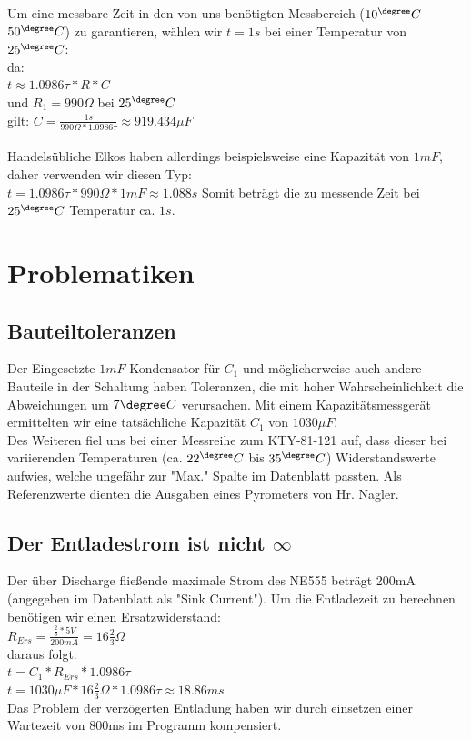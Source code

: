 \documentclass[12pt,titlepage]{article}
\begin{document}
		Um eine messbare Zeit in den von uns benötigten Messbereich ($10^{\degree}C$--$50^{\degree}C$) zu garantieren, wählen wir $t=1s$ bei einer Temperatur von $25^{\degree}C$:\\
		da:\\
		$t \approx 1.0986{\tau}*R*C$ \\
		und $R_1=990\Omega$ bei $25^{\degree}C$ \\
		gilt:
		$C = \frac{1s}{{990\Omega} * 1.0986{\tau}}  \approx 919.434{\mu}F$\\
		\hfill\\
		Handelsübliche Elkos haben allerdings beispielsweise eine Kapazität von $1mF$, daher verwenden wir diesen Typ:\\
		$t = 1.0986{\tau} * 990\Omega * 1mF \approx 1.088s$
		Somit beträgt die zu messende Zeit bei $25^{\degree}C$ Temperatur ca. $1s$.
	
		\section{Problematiken}	
			\subsection{Bauteiltoleranzen}
				Der Eingesetzte $1mF$ Kondensator für $C_1$ und möglicherweise auch andere Bauteile in der Schaltung haben Toleranzen, die mit hoher Wahrscheinlichkeit die Abweichungen um $7{\degree}C$ verursachen.
				Mit einem Kapazitätsmessgerät ermittelten wir eine tatsächliche Kapazität $C_1$ von $1030{\mu}F$.\\
				Des Weiteren fiel uns bei einer Messreihe zum KTY-81-121 auf, dass dieser bei variierenden Temperaturen (ca. $22^{\degree}C$ bis $35^{\degree}C$) Widerstandswerte aufwies, welche ungefähr zur "Max." Spalte im Datenblatt passten.
				Als Referenzwerte dienten die Ausgaben eines Pyrometers von Hr. Nagler.
				
			\subsection{Der Entladestrom ist nicht $\infty$}
				Der über Discharge fließende maximale Strom des NE555 beträgt 200mA (angegeben im Datenblatt als "Sink Current"). Um die Entladezeit zu berechnen benötigen wir einen Ersatzwiderstand:\\
				$R_{Ers} = \frac{ \frac{2}{3}*5V }{200mA} = 16\frac{2}{3}\Omega$\\
				daraus folgt:\\
				$t = C_1*R_{Ers}*1.0986{\tau}$\\
				$t = 1030{\mu}F * 16 \frac{2}{3}\Omega * 1.0986{\tau} \approx 18.86ms$\\
				Das Problem der verzögerten Entladung haben wir durch einsetzen einer Wartezeit von 800ms im Programm kompensiert.
				
\end{document}
